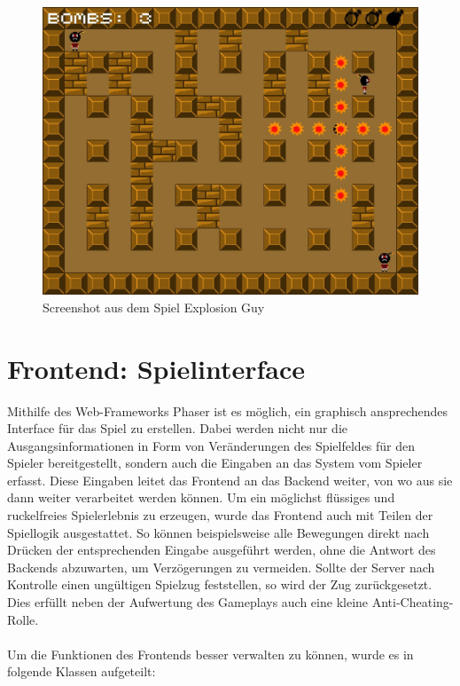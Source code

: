\documentclass[conference]{IEEEtran}
\begin{document}
\begin{figure}
    \centering
    \includegraphics[width=\textwidth]{Screenshotgame.jpg}
    \caption{Screenshot aus dem Spiel Explosion Guy}
\end{figure}

\section{Frontend: Spielinterface}
Mithilfe des Web-Frameworks Phaser\cite{phaser} ist es möglich, ein graphisch ansprechendes Interface für das Spiel zu erstellen. Dabei werden nicht nur die Ausgangsinformationen in Form von Veränderungen des Spielfeldes für den Spieler bereitgestellt, sondern auch die Eingaben an das System vom Spieler erfasst. Diese Eingaben leitet das Frontend an das Backend weiter, von wo aus sie dann weiter verarbeitet werden können. Um ein möglichst flüssiges und ruckelfreies Spielerlebnis zu erzeugen, wurde das Frontend auch mit Teilen der Spiellogik ausgestattet. So können beispielsweise alle Bewegungen direkt nach Drücken der entsprechenden Eingabe ausgeführt werden, ohne die Antwort des Backends abzuwarten, um Verzögerungen zu vermeiden. Sollte der Server nach Kontrolle einen ungültigen Spielzug feststellen, so wird der Zug zurückgesetzt. Dies erfüllt neben der Aufwertung des Gameplays auch eine kleine Anti-Cheating-Rolle.
\\
\\
Um die Funktionen des Frontends besser verwalten zu können, wurde es in folgende Klassen aufgeteilt:
\end{document}
